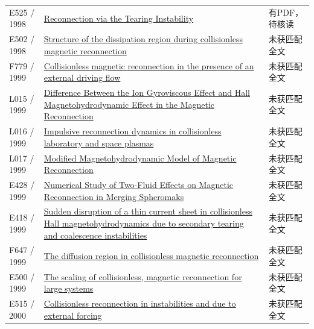 \documentclass[UTF8,a4paper,11pt,openany,fontset=fandol]{ctexbook}
\begin{document}
\begin{longtable}{P{24mm}P{97mm}P{27mm}}
E525 / 1998 & \href{https://doi.org/10.48550/arxiv.astro-ph/9804166}{Reconnection via the Tearing Instability} & 有PDF，待核读\\

E502 / 1998 & \href{https://doi.org/10.1029/97ja03528}{Structure of the dissipation region during collisionless magnetic reconnection} & 未获匹配全文\\

F779 / 1999 & \href{https://doi.org/10.1017/s0022377899007497}{Collisionless magnetic reconnection in the presence of an external driving flow} & 未获匹配全文\\

L015 / 1999 & \href{https://doi.org/10.1088/0256-307x/16/11/028}{Difference Between the Ion Gyroviscous Effect and Hall Magnetohydrodynamic Effect in the Magnetic Reconnection} & 未获匹配全文\\

L016 / 1999 & \href{https://doi.org/10.1029/1998ja900094}{Impulsive reconnection dynamics in collisionless laboratory and space plasmas} & 未获匹配全文\\

L017 / 1999 & \href{https://doi.org/10.1088/0256-307x/16/6/026}{Modified Magnetohydrodynamic Model of Magnetic Reconnection} & 未获匹配全文\\

E428 / 1999 & \href{https://ui.adsabs.harvard.edu/abs/1999APS..DPP.CP104B/abstract}{Numerical Study of Two-Fluid Effects on Magnetic Reconnection in Merging Spheromaks} & 未获匹配全文\\

E418 / 1999 & \href{https://doi.org/10.1029/1999gl003627}{Sudden disruption of a thin current sheet in collisionless Hall magnetohydrodynamics due to secondary tearing and coalescence instabilities} & 未获匹配全文\\

F647 / 1999 & \href{https://doi.org/10.1063/1.873436}{The diffusion region in collisionless magnetic reconnection} & 未获匹配全文\\

E500 / 1999 & \href{https://doi.org/10.1029/1999gl900481}{The scaling of collisionless,  magnetic reconnection for large systems} & 未获匹配全文\\

E515 / 2000 & \href{https://doi.org/10.1063/1.873822}{Collisionless reconnection in instabilities and due to external forcing} & 未获匹配全文\\


\end{longtable}
\end{document}
